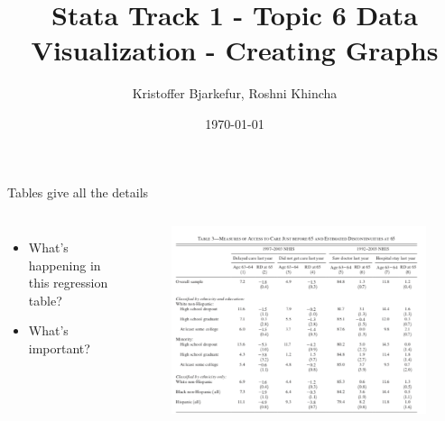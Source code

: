 \documentclass[aspectratio=169]{beamer}
\title{Stata Track 1 - Topic 6 \newline Data Visualization - \newline Creating Graphs}
\date{\today}
\author{Kristoffer Bjarkefur, Roshni Khincha} %
\institute{Development Impact Evaluation (DIME) \newline The World Bank }
\begin{document}
	{
		\maketitle
	}

\begin{frame}[fragile]{Tables give all the details}
	\begin{columns}[c]
		\begin{itemize}
			\item What’s happening in this regression table?
			\item What’s important?
		\end{itemize}
		\begin{figure}
			\centering
			\includegraphics[width=\linewidth]{img/regtable}
		\end{figure}
	\end{columns}
\end{frame}
\end{document}
